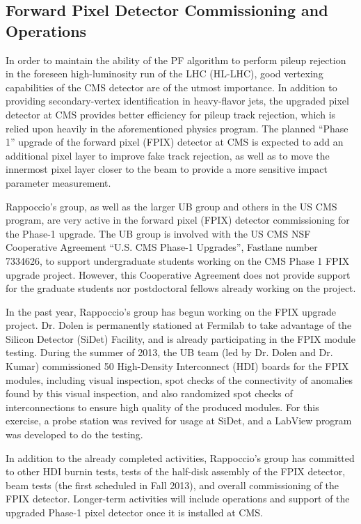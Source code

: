 \documentclass[12pt]{proposalnsf}
\begin{document}
\subsection{Forward Pixel Detector Commissioning and Operations} 

In order to maintain the ability of the PF algorithm to perform pileup
rejection in the foreseen high-luminosity run of the LHC (HL-LHC),
good vertexing capabilities of the CMS detector are of the
utmost importance. In addition to providing secondary-vertex
identification in heavy-flavor jets, the upgraded pixel detector at
CMS provides better efficiency for pileup track rejection, which is
relied upon heavily in the aforementioned physics program. The planned
``Phase 1'' upgrade of the forward pixel (FPIX) detector at CMS is
expected to add an additional pixel layer to improve fake track
rejection, as well as to move the innermost pixel layer closer to the
beam to provide a more sensitive impact parameter measurement. 

Rappoccio's group, as well as the larger UB group and others in the US
CMS program, are very active in
the forward pixel (FPIX) detector
commissioning for the Phase-1 upgrade. The UB group is involved with
the US CMS NSF Cooperative Agreement ``U.S. CMS Phase-1 Upgrades'',
Fastlane number 7334626, to support undergraduate students working on
the CMS Phase 1 FPIX upgrade project. 
However, this Cooperative Agreement does not provide support
for the graduate students nor postdoctoral fellows already working on
the project. 

In the past year, Rappoccio's group has begun working on the FPIX
upgrade project. Dr. Dolen is permanently stationed at Fermilab to
take advantage of the Silicon Detector (SiDet) Facility, and is
already participating in the FPIX module testing. During the
summer of 2013, the UB team (led by Dr. Dolen and Dr. Kumar)
commissioned 50 High-Density Interconnect
(HDI) boards for the FPIX modules, including visual inspection, spot
checks of the connectivity of anomalies found by this visual
inspection, and also randomized spot checks of interconnections to
ensure high quality of the produced modules. For this exercise, a
probe station was revived for usage at
SiDet, and a LabView program was developed to do the testing.

In addition to the already completed activities, Rappoccio's group has
committed to other HDI burnin tests, tests of the half-disk assembly
of the FPIX detector, beam tests (the first scheduled in Fall 2013),
and overall commissioning of the FPIX detector. Longer-term activities
will include operations and support of the upgraded Phase-1 pixel
detector once it is installed at CMS. 
\end{document}
